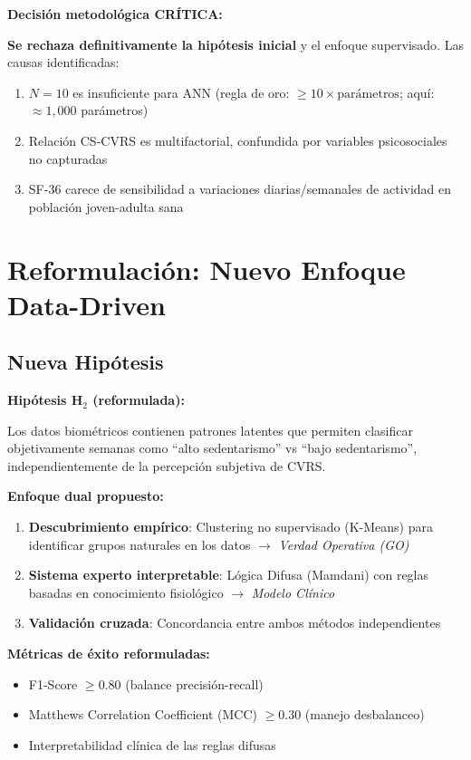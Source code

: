 \documentclass[12pt,letterpaper,twoside]{report}
\begin{document}
\begin{decisionbox}
\textbf{Decisión metodológica CRÍTICA:}

\textbf{Se rechaza definitivamente la hipótesis inicial} y el enfoque supervisado. Las causas identificadas:
\begin{enumerate}[noitemsep]
    \item $N=10$ es insuficiente para ANN (regla de oro: $\geq 10 \times \text{parámetros}$; aquí: $\approx 1,000$ parámetros)
    \item Relación CS-CVRS es multifactorial, confundida por variables psicosociales no capturadas
    \item SF-36 carece de sensibilidad a variaciones diarias/semanales de actividad en población joven-adulta sana
\end{enumerate}
\end{decisionbox}

\section{Reformulación: Nuevo Enfoque Data-Driven}

\subsection{Nueva Hipótesis}

\begin{hipotesisbox}
\textbf{Hipótesis H$_2$ (reformulada):}

Los datos biométricos contienen patrones latentes que permiten clasificar objetivamente semanas como ``alto sedentarismo'' vs ``bajo sedentarismo'', independientemente de la percepción subjetiva de CVRS.

\textbf{Enfoque dual propuesto:}
\begin{enumerate}[noitemsep]
    \item \textbf{Descubrimiento empírico}: Clustering no supervisado (K-Means) para identificar grupos naturales en los datos $\to$ \textit{Verdad Operativa (GO)}
    \item \textbf{Sistema experto interpretable}: Lógica Difusa (Mamdani) con reglas basadas en conocimiento fisiológico $\to$ \textit{Modelo Clínico}
    \item \textbf{Validación cruzada}: Concordancia entre ambos métodos independientes
\end{enumerate}
\end{hipotesisbox}

\begin{estadisticobox}
\textbf{Métricas de éxito reformuladas:}

\begin{itemize}[noitemsep]
    \item F1-Score $\geq 0.80$ (balance precisión-recall)
    \item Matthews Correlation Coefficient (MCC) $\geq 0.30$ (manejo desbalanceo)
    \item Interpretabilidad clínica de las reglas difusas
\end{itemize}
\end{estadisticobox}
\end{document}

